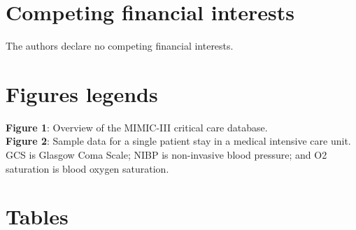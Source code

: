 \documentclass[english]{article}
\begin{document}
\section*{Competing financial interests}

The authors declare no competing financial interests.

\section*{Figures legends}




\noindent
\textbf{Figure 1}: Overview of the MIMIC-III critical care database. \\

\noindent
\textbf{Figure 2}: Sample data for a single patient stay in a medical intensive care unit. GCS is Glasgow Coma Scale; NIBP is non-invasive blood pressure; and O2 saturation is blood oxygen saturation.

\section*{Tables}

\end{document}
